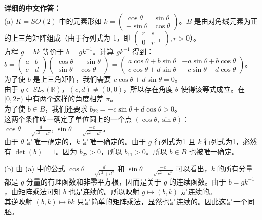 \documentclass{ctexart}
\begin{document}
\vspace{1em}
\textbf{详细的中文作答：}\\
(a) $K = SO(2)$ 中的元素形如 $k = \begin{pmatrix} \cos\theta & \sin\theta \\ -\sin\theta & \cos\theta \end{pmatrix}$。$B$ 是由对角线元素为正的上三角矩阵组成（由于行列式为 1，即 $\begin{pmatrix} r & s \\ 0 & r^{-1} \end{pmatrix}, r > 0$）。\\
方程 $g = bk$ 等价于 $b = gk^{-1}$。计算 $gk^{-1}$ 得到：\\
$b = \begin{pmatrix} a & b \\ c & d \end{pmatrix} \begin{pmatrix} \cos\theta & -\sin\theta \\ \sin\theta & \cos\theta \end{pmatrix} = \begin{pmatrix} a\cos\theta+b\sin\theta & -a\sin\theta+b\cos\theta \\ c\cos\theta+d\sin\theta & -c\sin\theta+d\cos\theta \end{pmatrix}$。\\
为了使 $b$ 是上三角矩阵，我们需要 $c\cos\theta + d\sin\theta = 0$。\\
由于 $g \in SL_2(\mathbb{R})$，$(c, d) \neq (0, 0)$，所以存在角度 $\theta$ 使得该等式成立。在 $[0, 2\pi)$ 中有两个这样的角度相差 $\pi$。\\
为了使 $b \in B$，我们还要求 $b_{22} = -c\sin\theta + d\cos\theta > 0$。\\
这两个条件唯一确定了单位圆上的一个点 $(\cos\theta, \sin\theta)$：\\
$\cos\theta = \frac{d}{\sqrt{c^2+d^2}}$, $\sin\theta = \frac{-c}{\sqrt{c^2+d^2}}$。\\
由于 $\theta$ 是唯一确定的，$k$ 是唯一确定的。由于 $g$ 行列式为1 且 $k$ 行列式为1，必然有 $\det(b) = 1$。因为 $b_{22} > 0$，所以 $b_{11} > 0$。所以 $b \in B$ 也被唯一确定。

(b) 由 (a) 中的公式 $\cos\theta = \frac{d}{\sqrt{c^2+d^2}}$ 和 $\sin\theta = \frac{-c}{\sqrt{c^2+d^2}}$ 可以看出，$k$ 的所有分量都是 $g$ 分量的有理函数和非零平方根，因而是关于 $g$ 的连续函数。由于 $b = gk^{-1}$，由矩阵乘法可知 $b$ 也是连续的。所以映射 $g \mapsto (b, k)$ 是连续的。\\
其逆映射 $(b, k) \mapsto bk$ 只是简单的矩阵乘法，显然也是连续的。因此这是一个同胚。
\end{document}
